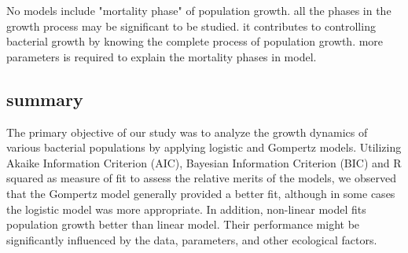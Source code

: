 \documentclass{article}
\begin{document}
No models include "mortality phase" of  population growth. all the phases in the growth process may be significant to be studied. it contributes to controlling bacterial growth by knowing the complete process of population growth. more parameters is required to explain the mortality phases in model.

\subsection{summary}
The primary objective of our study was to analyze the growth dynamics of various bacterial populations by applying logistic and Gompertz models. Utilizing Akaike Information Criterion (AIC), Bayesian Information Criterion (BIC) and R squared as measure of fit to assess the relative merits of the models, we observed that the Gompertz model generally provided a better fit, although in some cases the logistic model was more appropriate. In addition, non-linear model fits population growth better than linear model. Their performance might be significantly influenced by the data, parameters, and other ecological factors. 

\newpage  

 

\end{document}
